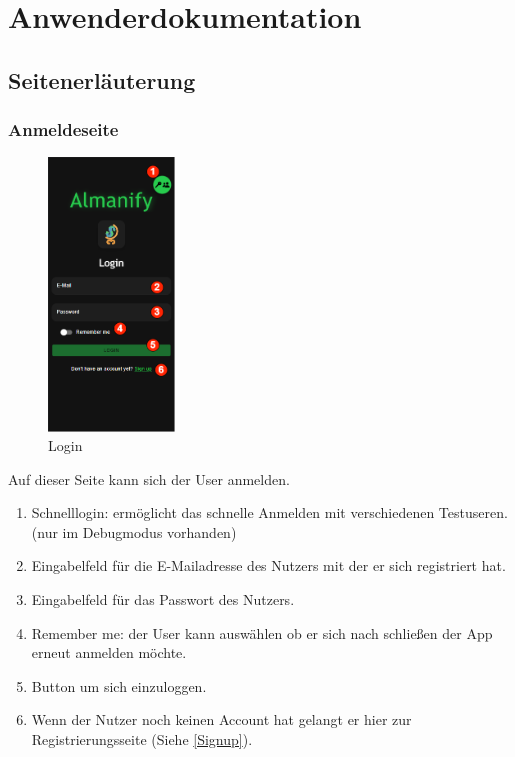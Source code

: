 \section{Anwenderdokumentation}



\subsection{Seitenerläuterung}

\subsubsection{Anmeldeseite}\label{Login}
\begin{figure}[H]
    \centering
    \includegraphics[width=0.3\textwidth]{img/pages_numbers/login.drawio}
    \caption[Login]{Login}
    \label{fig:Login}
\end{figure}
Auf dieser Seite kann sich der User anmelden.
\begin{enumerate}[label=\protect\circled{\arabic*}]
	\item Schnelllogin: ermöglicht das schnelle Anmelden mit verschiedenen Testuseren. (nur im Debugmodus vorhanden)
	\item Eingabelfeld für die E-Mailadresse des Nutzers mit der er sich registriert hat.
	\item Eingabelfeld für das Passwort des Nutzers.
	\item Remember me: der User kann auswählen ob er sich nach schließen der App erneut anmelden möchte.
	\item Button um sich einzuloggen.
	\item Wenn der Nutzer noch keinen Account hat gelangt er hier zur Registrierungsseite (Siehe \ref{Signup}).
\end{enumerate}

